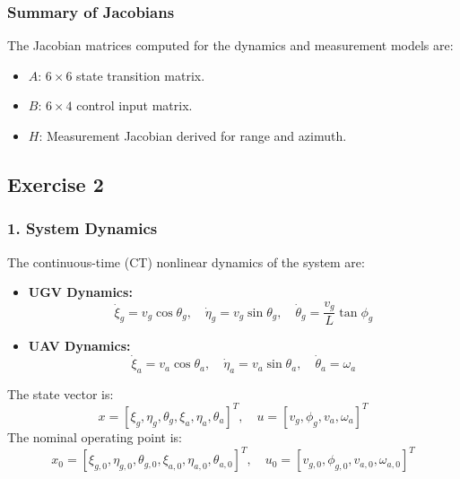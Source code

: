 \subsubsection*{Summary of Jacobians}
The Jacobian matrices computed for the dynamics and measurement models are:
\begin{itemize}
    \item \( A \): \( 6 \times 6 \) state transition matrix.
    \item \( B \): \( 6 \times 4 \) control input matrix.
    \item \( H \): Measurement Jacobian derived for range and azimuth.
\end{itemize}

\subsection*{Exercise 2}


\subsubsection*{1. System Dynamics}
The continuous-time (CT) nonlinear dynamics of the system are:
\begin{itemize}
    \item \textbf{UGV Dynamics:}
    \[
    \dot{\xi}_g = v_g \cos\theta_g, \quad \dot{\eta}_g = v_g \sin\theta_g, \quad \dot{\theta}_g = \frac{v_g}{L} \tan\phi_g
    \]
    \item \textbf{UAV Dynamics:}
    \[
    \dot{\xi}_a = v_a \cos\theta_a, \quad \dot{\eta}_a = v_a \sin\theta_a, \quad \dot{\theta}_a = \omega_a
    \]
\end{itemize}

\noindent The state vector is:
\[
x = [\xi_g, \eta_g, \theta_g, \xi_a, \eta_a, \theta_a]^T, \quad
u = [v_g, \phi_g, v_a, \omega_a]^T
\]
The nominal operating point is:
\[
x_0 = [\xi_{g,0}, \eta_{g,0}, \theta_{g,0}, \xi_{a,0}, \eta_{a,0}, \theta_{a,0}]^T, \quad
u_0 = [v_{g,0}, \phi_{g,0}, v_{a,0}, \omega_{a,0}]^T
\]

